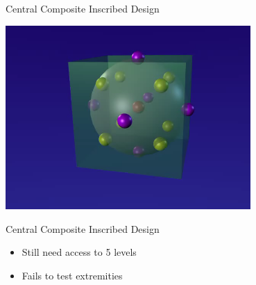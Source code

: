\documentclass[14pt]{beamer}
\begin{document}
\begin{frame}{Central Composite Inscribed Design}
\begin{center}
\includegraphics[width=0.7\textwidth]{3level3factorCCI23D.png}
\end{center}
\end{frame}


\begin{frame}{Central Composite Inscribed Design}
\pause
\begin{itemize}
\item Still need access to 5 levels
\pause
\item Fails to test extremities
\end{itemize}

\end{frame}
\end{document}
